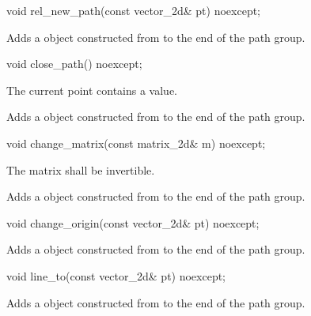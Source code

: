 %
\begin{itemdecl}
void rel_new_path(const vector_2d& pt) noexcept;
\end{itemdecl}
\begin{itemdescr}
\pnum
\effects
Adds a  object constructed from  to the end of the path group.
\end{itemdescr}

%
\begin{itemdecl}
void close_path() noexcept;
\end{itemdecl}
\begin{itemdescr}
\pnum
\requires
The current point contains a value.

\pnum
\effects
Adds a  object constructed from  to the end of the path group.
\end{itemdescr}

%
\begin{itemdecl}
void change_matrix(const matrix_2d& m) noexcept;
\end{itemdecl}
\begin{itemdescr}
\pnum
\requires
The matrix  shall be invertible.

\pnum
\effects
Adds a  object constructed from  to the end of the path group.
\end{itemdescr}

%
\begin{itemdecl}
void change_origin(const vector_2d& pt) noexcept;
\end{itemdecl}
\begin{itemdescr}
\pnum
\effects
Adds a  object constructed from  to the end of the path group.
\end{itemdescr}

%
\begin{itemdecl}
void line_to(const vector_2d& pt) noexcept;
\end{itemdecl}
\begin{itemdescr}
\pnum
Adds a  object constructed from  to the end of the path group.
\end{itemdescr}

